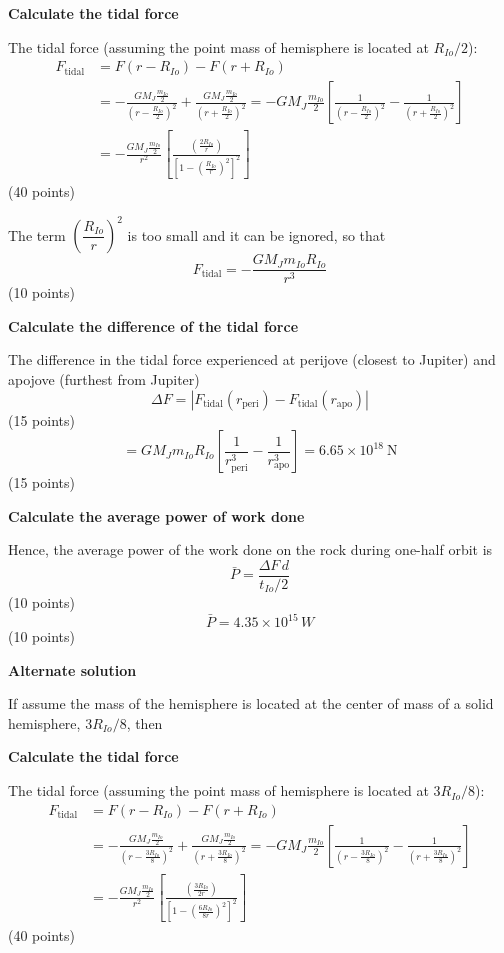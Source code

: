 \textbf{Calculate the tidal force}

The tidal force (assuming the point mass of hemisphere is located at
$R_{Io}/2$):
\begin{align*}
  F_{\mathrm{tidal}} &= F(r - R_{Io}) - F(r + R_{Io}) \\ %
  &= -\frac{GM_J\frac{m_{Io}}{2}}{\left(r - \frac{R_{Io}}{2}\right)^2}
     + \frac{GM_J\frac{m_{Io}}{2}}{\left(r + \frac{R_{Io}}{2}\right)^2}
   = -GM_J\frac{m_{Io}}{2}
     \left[\frac{1}{\left(r - \frac{R_{Io}}{2}\right)^2}
     - \frac{1}{\left(r + \frac{R_{Io}}{2}\right)^2}\right] \\
  &= -\frac{GM_J\frac{m_{Io}}{2}}{r^2}
     \left[\frac{\left(\frac{2R_{Io}}{r}\right)}
     {\left[1 - \left(\frac{R_{Io}}{r}\right)^2\right]^2}\right] %
\end{align*}
\hfill(40 points)

The term $\left(\dfrac{R_{Io}}{r}\right)^2$ is too small and it can be
ignored, so that
\[
  F_{\mathrm{tidal}} = -\frac{GM_J m_{Io} R_{Io}}{r^3}
\]
\hfill(10 points)

\medskip
\textbf{Calculate the difference of the tidal force}

The difference in the tidal force experienced at perijove (closest to Jupiter)
and apojove (furthest from Jupiter)
\[
  \Delta F = \left|F_{\mathrm{tidal}}(r_{\mathrm{peri}})
    - F_{\mathrm{tidal}}(r_{\mathrm{apo}})\right|
\]
\hfill(15 points)
\[
  = GM_J m_{Io} R_{Io}
    \left[\frac{1}{r_{\mathrm{peri}}^3} - \frac{1}{r_{\mathrm{apo}}^3}\right]
  = 6.65\times10^{18}\ \mathrm{N}
\]
\hfill(15 points)

\medskip
\textbf{Calculate the average power of work done}

Hence, the average power of the work done on the rock during one-half orbit
is
\[
  \bar P = \frac{\Delta F\,d}{t_{Io}/2}
\]
\hfill(10 points)
\[
  \bar P = 4.35\times10^{15}\,W
\]
\hfill(10 points)

\bigskip
\textbf{Alternate solution}

If assume the mass of the hemisphere is located at the center of mass of a %
solid hemisphere, $3R_{Io}/8$, then

\medskip
\textbf{Calculate the tidal force}

The tidal force (assuming the point mass of hemisphere is located at
$3R_{Io}/8$):
\begin{align*}
  F_{\mathrm{tidal}} &= F(r - R_{Io}) - F(r + R_{Io}) \\
  &= -\frac{GM_J\frac{m_{Io}}{2}}{\left(r - \frac{3R_{Io}}{8}\right)^2}
     + \frac{GM_J\frac{m_{Io}}{2}}{\left(r + \frac{3R_{Io}}{8}\right)^2}
   = -GM_J\frac{m_{Io}}{2}
     \left[\frac{1}{\left(r - \frac{3R_{Io}}{8}\right)^2}
     - \frac{1}{\left(r + \frac{3R_{Io}}{8}\right)^2}\right] \\
  &= -\frac{GM_J\frac{m_{Io}}{2}}{r^2}
     \left[\frac{\left(\frac{3R_{Io}}{2r}\right)}
     {\left[1 - \left(\frac{6R_{Io}}{8r}\right)^2\right]^2}\right] %
\end{align*}
\hfill(40 points)

